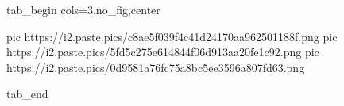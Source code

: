  
 
 
 
 


\ifcmt
  tab_begin cols=3,no_fig,center

     pic https://i2.paste.pics/c8ae5f039f4c41d24170aa962501188f.png
		 pic https://i2.paste.pics/5fd5c275e614844f06d913aa20fe1c92.png
		 pic https://i2.paste.pics/0d9581a76fc75a8bc5ee3596a807fd63.png

  tab_end
\fi

